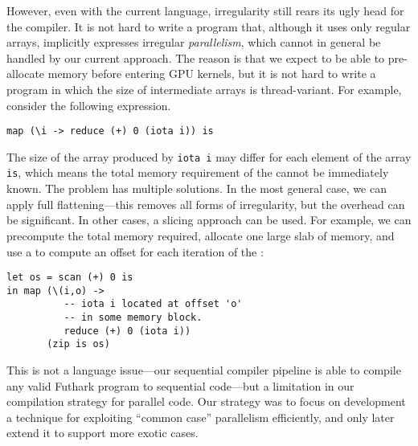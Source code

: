 However, even with the current language, irregularity still rears its
ugly head for the compiler.  It is not hard to write a program that,
although it uses only regular arrays, implicitly expresses irregular
\textit{parallelism}, which cannot in general be handled by our
current approach.  The reason is that we expect to be able to
pre-allocate memory before entering GPU kernels, but it is not hard to
write a program in which the size of intermediate arrays is
thread-variant.  For example, consider the following expression.
\begin{lstlisting}
map (\i -> reduce (+) 0 (iota i)) is
\end{lstlisting}
\noindent The size of the array produced by \lstinline{iota i} may
differ for each element of the array \texttt{is}, which means the
total memory requirement of the  cannot be immediately known.
The problem has multiple solutions.  In the most general case, we can
apply full flattening---this removes all forms of irregularity, but
the overhead can be significant.  In other cases, a slicing approach
can be used.  For example, we can precompute the total memory
required, allocate one large slab of memory, and use a  to
compute an offset for each iteration of the :
\begin{lstlisting}
let os = scan (+) 0 is
in map (\(i,o) ->
          -- iota i located at offset 'o'
          -- in some memory block.
          reduce (+) 0 (iota i))
       (zip is os)
\end{lstlisting}

This is not a language issue---our sequential compiler pipeline is
able to compile any valid Futhark program to sequential code---but a
limitation in our compilation strategy for parallel code.  Our
strategy was to focus on development a technique for exploiting
``common case'' parallelism efficiently, and only later extend it to
support more exotic cases.

